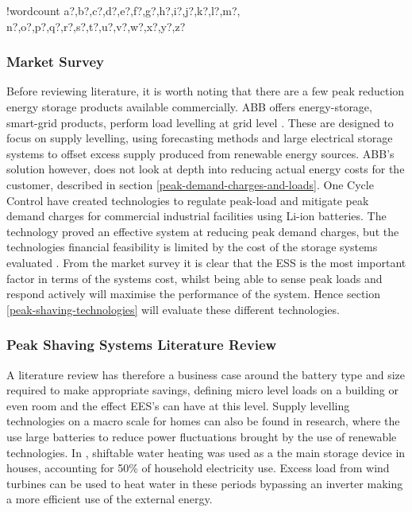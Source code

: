 \documentclass[10pt]{article}
\newcounter{words}
\newenvironment{counted}{%
  \setcounter{words}{0}
  \SearchList!{wordcount}{\stepcounter{words}}
    {a?,b?,c?,d?,e?,f?,g?,h?,i?,j?,k?,l?,m?,
    n?,o?,p?,q?,r?,s?,t?,u?,v?,w?,x?,y?,z?}
  \UndoBoundary{'}
  \SearchOrder{p;}}{%
  \StopSearching}
\begin{document}
\begin{counted}
\subsubsection{Market Survey}\label{market-survey}

Before reviewing literature, it is worth noting that there are a few
peak reduction energy storage products available commercially. ABB
offers energy-storage, smart-grid products, perform load levelling at
grid level \cite{abbpeakshave}. These are designed to focus on supply
levelling, using forecasting methods and large electrical storage
systems to offset excess supply \cite{5559470} produced from renewable
energy sources. ABB's solution however, does not look at depth into
reducing actual energy costs for the customer, described in section
\ref{peak-demand-charges-and-loads}. One Cycle Control have created
technologies to regulate peak-load and mitigate peak demand charges for
commercial industrial facilities using Li-ion
batteries\cite{peakload38:online}. The technology proved an effective
system at reducing peak demand charges, but the technologies financial
feasibility is limited by the cost of the storage systems evaluated
\cite{Demonstr51:online}. From the market survey it is clear that the
ESS is the most important factor in terms of the systems cost, whilst
being able to sense peak loads and respond actively will maximise the
performance of the system. Hence section \ref{peak-shaving-technologies}
will evaluate these different technologies.

\subsubsection{Peak Shaving Systems Literature
Review}\label{peak-shaving-systems-literature-review}

A literature review has therefore a business case around the battery
type and size required to make appropriate savings, defining micro level
loads on a building or even room and the effect EES's can have at this
level. Supply levelling technologies on a macro scale for homes can also
be found in research, where the use large batteries to reduce power
fluctuations brought by the use of renewable technologies. In
\cite{Allik20161116}, shiftable water heating was used as a the main
storage device in houses, accounting for 50\% of household electricity
use. Excess load from wind turbines can be used to heat water in these
periods bypassing an inverter making a more efficient use of the
external energy. \cite{7564619}


\end{counted}
\end{document}
